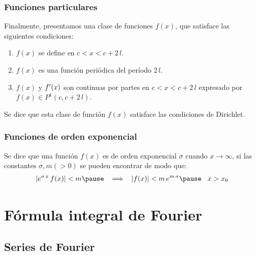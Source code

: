 \documentclass[12pt]{beamer}
\begin{document}
\begin{frame}
\frametitle{Funciones particulares}
Finalmente, presentamos una clase de funciones $f (x)$, que satisface las siguientes condiciones:
\begin{enumerate}[<+->]
\item $f (x)$ se define en $c < x < c + 2 \, l$.
\item $f (x)$ es una función periódica del período $2 \, l$.
\item $f (x)$ y ${f}^{\prime} (x)$ son continuas por partes en $c  < x <c + 2 \, l$ expresado por $f (x) \in P^{1} (c, c + 2 \, l)$.
\end{enumerate}
\pause
Se dice que esta clase de función $f (x)$ satisface las condiciones de Dirichlet. 
\end{frame}
\begin{frame}
\frametitle{Funciones de orden exponencial}
Se dice que una función $f (x)$ es de orden exponencial $\sigma$ cuando $x \to \infty$, si las constantes $\sigma, m (> 0)$ se pueden encontrar de modo que:
\pause
\begin{eqnarray*}
\begin{aligned}
\abs{ e^{\sigma \, x} \, f (x)} < m \pause \hspace{0.3cm} \Longrightarrow \hspace{0.3cm} \abs{f (x)} < m \, e^{m \, \sigma} \pause \hspace{0.3cm} x > x_{0}
\end{aligned}
\end{eqnarray*}
\end{frame}



\section{Fórmula integral de Fourier}
\subsection{Series de Fourier}
\end{document}
